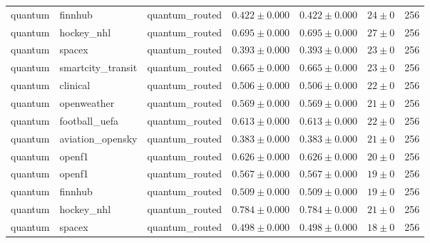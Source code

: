\begin{table}[htbp]
\begin{tabular}{l l l r r r r}
quantum & finnhub & quantum\_routed & $0.422\pm0.000$ & $0.422\pm0.000$ & $24\pm0$ & 256 \\
quantum & hockey\_nhl & quantum\_routed & $0.695\pm0.000$ & $0.695\pm0.000$ & $27\pm0$ & 256 \\
quantum & spacex & quantum\_routed & $0.393\pm0.000$ & $0.393\pm0.000$ & $23\pm0$ & 256 \\
quantum & smartcity\_transit & quantum\_routed & $0.665\pm0.000$ & $0.665\pm0.000$ & $23\pm0$ & 256 \\
quantum & clinical & quantum\_routed & $0.506\pm0.000$ & $0.506\pm0.000$ & $22\pm0$ & 256 \\
quantum & openweather & quantum\_routed & $0.569\pm0.000$ & $0.569\pm0.000$ & $21\pm0$ & 256 \\
quantum & football\_uefa & quantum\_routed & $0.613\pm0.000$ & $0.613\pm0.000$ & $22\pm0$ & 256 \\
quantum & aviation\_opensky & quantum\_routed & $0.383\pm0.000$ & $0.383\pm0.000$ & $21\pm0$ & 256 \\
quantum & openf1 & quantum\_routed & $0.626\pm0.000$ & $0.626\pm0.000$ & $20\pm0$ & 256 \\
quantum & openf1 & quantum\_routed & $0.567\pm0.000$ & $0.567\pm0.000$ & $19\pm0$ & 256 \\
quantum & finnhub & quantum\_routed & $0.509\pm0.000$ & $0.509\pm0.000$ & $19\pm0$ & 256 \\
quantum & hockey\_nhl & quantum\_routed & $0.784\pm0.000$ & $0.784\pm0.000$ & $21\pm0$ & 256 \\
quantum & spacex & quantum\_routed & $0.498\pm0.000$ & $0.498\pm0.000$ & $18\pm0$ & 256 \\
\hline
\end{tabular}
\end{table}
